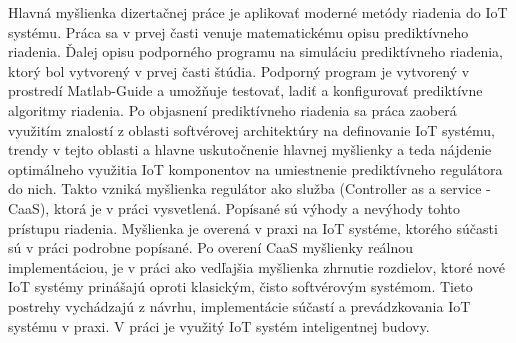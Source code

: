 Hlavná myšlienka dizertačnej práce je aplikovať moderné metódy riadenia do IoT systému. Práca sa v prvej časti venuje matematickému opisu prediktívneho riadenia. Ďalej opisu podporného programu na simuláciu prediktívneho riadenia, ktorý bol vytvorený v prvej časti štúdia. Podporný program je vytvorený v prostredí Matlab-Guide a umožňuje testovať, ladiť a konfigurovať prediktívne algoritmy riadenia. 
Po objasnení prediktívneho riadenia sa práca zaoberá využitím znalostí z oblasti softvérovej architektúry na definovanie IoT systému, trendy v tejto oblasti a hlavne uskutočnenie hlavnej myšlienky a teda nájdenie optimálneho využitia IoT komponentov na umiestnenie prediktívneho regulátora do nich. Takto vzniká myšlienka regulátor ako služba (Controller as a service - CaaS), ktorá je v práci vysvetlená. Popísané sú výhody a nevýhody tohto prístupu riadenia. Myšlienka je overená v praxi na IoT systéme, ktorého súčasti sú v práci podrobne popísané. Po overení CaaS myšlienky reálnou implementáciou, je v práci ako vedľajšia myšlienka zhrnutie rozdielov, ktoré  nové IoT systémy prinášajú oproti klasickým, čisto softvérovým systémom. Tieto postrehy vychádzajú z návrhu, implementácie súčastí a  prevádzkovania IoT systému v praxi. V práci je využitý IoT systém inteligentnej budovy.
